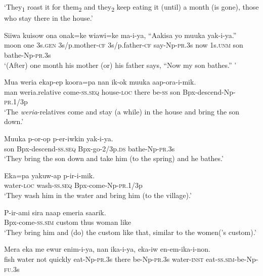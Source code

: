 \glt ‘They\textsubscript{1} roast it for them\textsubscript{2 }and they\textsubscript{2} keep eating it (until) a month (is gone), those who stay there in the house.’ \\
\z


\ea\label{ex:a:x31}
\gll  Siiwa  kuisow  ona  onak=ke  wiawi=ke  ma-i-ya,  “Aakisa        yo  muuka  yak-i-ya.” \\
moon  one  3s.\textsc{gen}  3s/p.mother-\textsc{cf}  3s/p.father-\textsc{cf}  say-Np-\textsc{pr}.3s  now  1s.\textsc{unm}  son  bathe-Np-\textsc{pr}.3s \\


\glt ‘(After) one month his mother (or) his father says, “Now my son bathes.” ’ \\
\z


\ea\label{ex:a:x32}
\gll  Mua  weria  ekap-ep  koora=pa  nan  ik-ok  muuka         aap-ora-i-mik. \\
man  weria.relative  come-\textsc{ss.seq}  house-\textsc{loc}  there  be-\textsc{ss}  son Bpx-descend-Np-\textsc{pr}.1/3p \\


\glt ‘The \textit{weria}{}-relatives come and stay (a while) in the house and bring the son down.’ \\
\z


\ea\label{ex:a:x33}
\gll  Muuka  p-or-op  p-er-iwkin  yak-i-ya. \\
son  Bpx-descend-\textsc{ss.seq}  Bpx-go-2/3p.\textsc{ds}  bathe-Np-\textsc{pr}.3s \\
\glt ‘They bring the son down and take him (to the spring) and he bathes.’ \\
\z


\ea\label{ex:a:x34}
\gll  Eka=pa  yakuw-ap  p-ir-i-mik. \\
water-\textsc{loc}  wash-\textsc{ss.seq}  Bpx-come-Np-\textsc{pr}.1/3p \\
\glt ‘They wash him in the water and bring him (to the village).’ \\
\z


\ea\label{ex:a:x35}
\gll  P-ir-ami  sira  naap  emeria  saarik. \\
Bpx-come-\textsc{ss}.\textsc{sim}  custom  thus  woman  like \\
\glt ‘They bring him and (do) the custom like that, similar to the women(’s custom).’ \\
\z


\ea\label{ex:a:x36}
\gll  Mera  eka  me  ewur  enim-i-ya,  nan  ika-i-ya,  eka-iw           en-em-ika-i-non. \\
fish  water  not  quickly  eat-Np-\textsc{pr}.3s  there  be-Np-\textsc{pr}.3s  water-\textsc{inst} eat-\textsc{ss}.\textsc{sim}-be-Np-\textsc{fu}.3s \\


